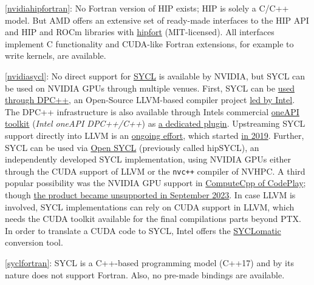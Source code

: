 \item \ref{nvidiahipfortran}: No Fortran version of HIP exists; HIP is solely a C/C++ model. But AMD offers an extensive set of ready-made interfaces to the HIP API and HIP and ROCm libraries with \href{https://github.com/ROCmSoftwarePlatform/hipfort}{hipfort} (MIT-licensed). All interfaces implement C functionality and CUDA-like Fortran extensions, for example to write kernels, are available.
\item \ref{nvidiasycl}: No direct support for \href{https://www.khronos.org/sycl/}{SYCL} is available by NVIDIA, but SYCL can be used on NVIDIA GPUs through multiple venues. First, SYCL can be \href{https://github.com/intel/llvm/blob/sycl/sycl/doc/GetStartedGuide.md\#build-dpc-toolchain-with-support-for-nvidia-cuda}{used through DPC++}, an Open-Source LLVM-based compiler project \href{https://github.com/intel/llvm}{led by Intel}. The DPC++ infrastructure is also available through Intel\textquotesingle s commercial \href{https://www.intel.com/content/www/us/en/developer/tools/oneapi/dpc-compiler.html}{oneAPI toolkit} (\emph{Intel oneAPI DPC++/C++}) as \href{https://developer.codeplay.com/products/oneapi/nvidia/2023.2.1/guides/get-started-guide-nvidia}{a dedicated plugin}. Upstreaming SYCL support directly into LLVM is an \href{https://github.com/intel/llvm/issues/49}{ongoing effort}, which started \href{https://lists.llvm.org/pipermail/cfe-dev/2019-January/060811.html}{in 2019}. Further, SYCL can be used via \href{https://github.com/OpenSYCL/OpenSYCL/}{Open SYCL} (previously called hipSYCL), an independently developed SYCL implementation, using NVIDIA GPUs either through the CUDA support of LLVM or the \texttt{nvc++} compiler of NVHPC. A third popular possibility was the NVIDIA GPU support in \href{https://github.com/codeplaysoftware/sycl-for-cuda/tree/cuda}{ComputeCpp of CodePlay}; though \href{https://developer.codeplay.com/products/computecpp/ce/home/}{the product became unsupported in September 2023}. In case LLVM is involved, SYCL implementations can rely on CUDA support in LLVM, which needs the CUDA toolkit available for the final compilations parts beyond PTX. In order to translate a CUDA code to SYCL, Intel offers the \href{https://github.com/oneapi-src/SYCLomatic}{SYCLomatic} conversion tool.
\item \ref{syclfortran}: SYCL is a C++-based programming model (C++17) and by its nature does not support Fortran. Also, no pre-made bindings are available.
